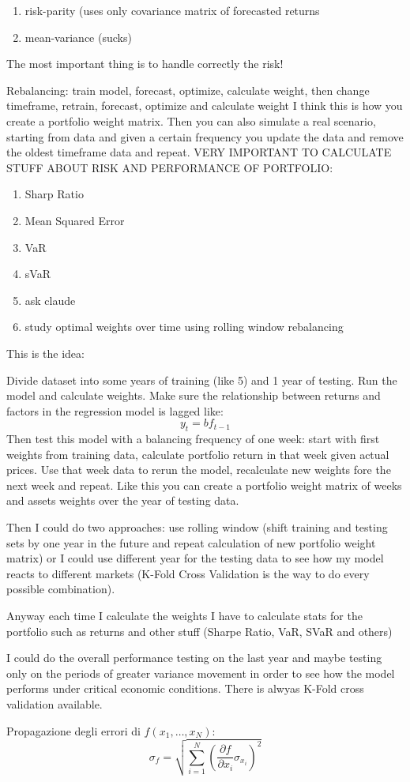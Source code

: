 \begin{enumerate}
    \item risk-parity (uses only covariance matrix of forecasted returns
    \item mean-variance (sucks)
\end{enumerate}
The most important thing is to handle correctly the risk!

Rebalancing: train model, forecast, optimize, calculate weight, then change timeframe, retrain, forecast, optimize and calculate weight
I think this is how you create a portfolio weight matrix.
Then you can also simulate a real scenario, starting from data and given a certain frequency you update the data and remove the oldest timeframe data and repeat.
VERY IMPORTANT TO CALCULATE STUFF ABOUT RISK AND PERFORMANCE OF PORTFOLIO:
\begin{enumerate}
    \item Sharp Ratio
    \item Mean Squared Error
    \item VaR
    \item sVaR
    \item ask claude
    \item study optimal weights over time using rolling window rebalancing
\end{enumerate}

This is the idea:

Divide dataset into some years of training (like 5) and 1 year of testing. Run the model and calculate weights. Make sure the relationship between returns and factors in the regression model is lagged like:
\begin{equation}
    y_t = bf_{t-1}
\end{equation}
Then test this model with a balancing frequency of one week: start with first weights from training data, calculate portfolio return in that week given actual prices. Use that week data to rerun the model, recalculate new weights fore the next week and repeat. Like this you can create a portfolio weight matrix of weeks and assets weights over the year of testing data. 

Then I could do two approaches: use rolling window (shift training and testing sets by one year in the future and repeat calculation of new portfolio weight matrix) or I could use different year for the testing data to see how my model reacts to different markets (K-Fold Cross Validation is the way to do every possible combination).

Anyway each time I calculate the weights I have to calculate stats for the portfolio such as returns and other stuff (Sharpe Ratio, VaR, SVaR and others)

I could do the overall performance testing on the last year and maybe testing only on the periods of greater variance movement in order to see how the model performs under critical economic conditions. 
There is alwyas K-Fold cross validation available.


Propagazione degli errori di $f(x_1,\dots,x_N)$:
\begin{equation}
	\sigma_f = \sqrt{\sum_{i = 1}^{N}(\frac{\partial f}{\partial x_i}\sigma_{x_i})^2}
\end{equation}